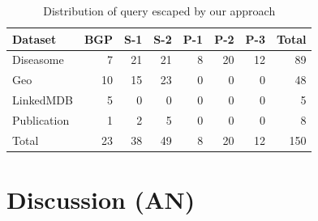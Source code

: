 \documentclass{sig-alternate}  %
\begin{document}
\begin{table}
\centering
\begin{tabular}{lrrrrrrr}
\hline
Dataset		&BGP 	&S-1&S-2&P-1&P-2&P-3&Total \\\hline
Diseasome				&7		&21	&21	&8	&20	&12	&89\\
Geo 	&10		&15	&23	&0	&0	&0	&48\\
LinkedMDB				&5		&0	&0	&0	&0	&0	&5\\
Publication			&1		&2	&5	&0	&0	&0	&8\\\hline
Total 					&23		&38	&49	&8	&20	&12	&150 \\\hline
\end{tabular}
\caption{Distribution of query escaped by our approach}
\label{tab:escaped}
\end{table}





\section{Discussion (AN)}
\end{document}
